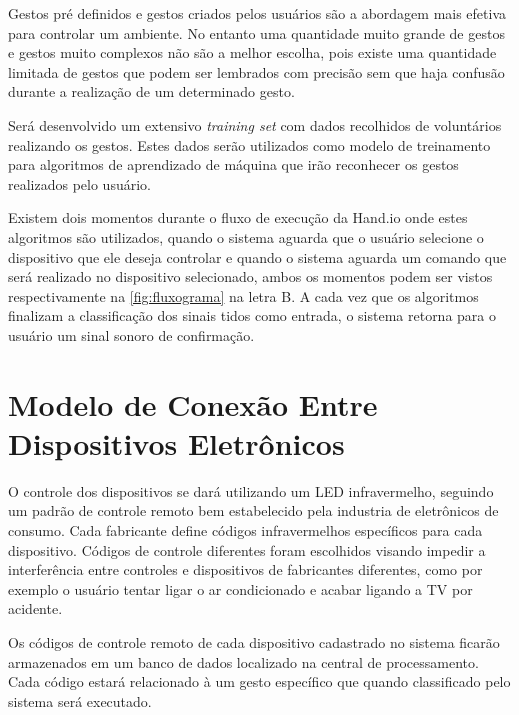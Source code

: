 Gestos pré definidos e gestos criados pelos usuários são a abordagem mais efetiva para controlar um ambiente.
No entanto uma quantidade muito grande de gestos e gestos muito complexos não são a melhor escolha, pois existe uma quantidade limitada de gestos que podem ser lembrados com precisão sem que haja confusão durante a realização de um determinado gesto.

Será desenvolvido um extensivo \textit{training set} com dados recolhidos de voluntários realizando os gestos. Estes dados serão utilizados como modelo de treinamento para algoritmos de aprendizado de máquina que irão reconhecer os gestos realizados pelo usuário. 



Existem dois momentos durante o fluxo de execução da Hand.io onde estes algoritmos são utilizados, quando o sistema aguarda que o usuário selecione o dispositivo que ele deseja controlar e quando o sistema aguarda um comando que será realizado no dispositivo selecionado, ambos os momentos podem ser vistos respectivamente na \autoref{fig:fluxograma} na letra B. A cada vez que os algoritmos finalizam a classificação dos sinais tidos como entrada, o sistema retorna para o usuário um sinal sonoro de confirmação. 




\section{Modelo de Conexão Entre Dispositivos Eletrônicos}

O controle dos dispositivos se dará utilizando um LED infravermelho, seguindo um padrão de controle remoto bem estabelecido pela industria de eletrônicos de consumo. Cada fabricante define códigos infravermelhos específicos para cada dispositivo. Códigos de controle diferentes foram escolhidos visando impedir a interferência entre controles e dispositivos de fabricantes diferentes, como por exemplo o usuário tentar ligar o ar condicionado e acabar ligando a TV por acidente.

Os códigos de controle remoto de cada dispositivo cadastrado no sistema ficarão armazenados em um banco de dados localizado na central de processamento. Cada código estará relacionado à um gesto específico que quando classificado pelo sistema será executado.



